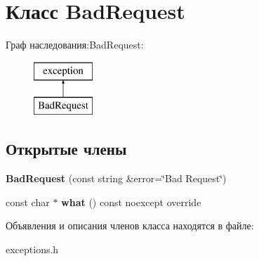 \hypertarget{class_bad_request}{}\section{Класс Bad\+Request}
\label{class_bad_request}
Граф наследования\+:Bad\+Request\+:\begin{figure}[H]
\begin{center}
\leavevmode
\includegraphics[height=2.000000cm]{class_bad_request}
\end{center}
\end{figure}
\subsection*{Открытые члены}
\begin{DoxyCompactItemize}
\item 
\mbox{\label{class_bad_request_a9de00a98b3542f82f39179c11f50b68a}} 
{\bfseries Bad\+Request} (const string \&error=\char`\"{}Bad Request\char`\"{})
\item 
\mbox{\label{class_bad_request_ae90e8414e00f29e64407a3451cfc0e34}} 
const char $\ast$ {\bfseries what} () const noexcept override
\end{DoxyCompactItemize}


Объявления и описания членов класса находятся в файле\+:\begin{DoxyCompactItemize}
\item 
exceptions.\+h\end{DoxyCompactItemize}
